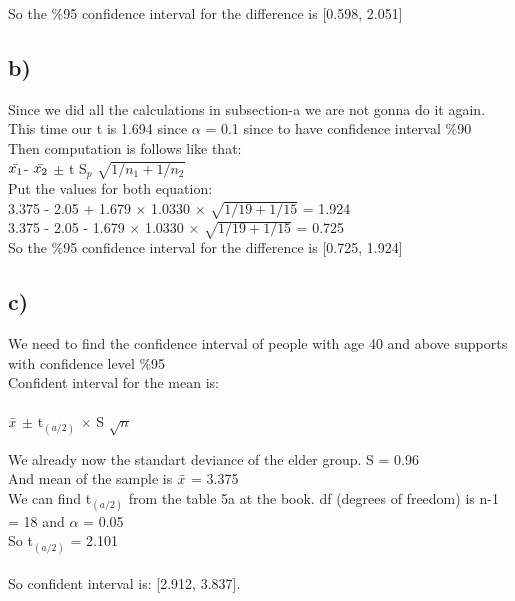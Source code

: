 \documentclass[12pt]{article}
\begin{document}
So the $\%$95 confidence interval for the difference is [0.598, 2.051]\\

\subsection*{b)} 

Since we did all the calculations in subsection-a we are not gonna do it again.\\
This time our t is 1.694 since $\alpha$ = 0.1 since to have confidence interval $\%$90\\

Then computation is follows like that:\\

$\Bar{x_1}$- $\Bar{x_2}$ $\pm$  t  S$_p$ $\sqrt{1/ n_1 + 1/n_2}$\\
Put the values for both equation:\\

3.375 - 2.05 +  1.679 $\times$ 1.0330 $\times$ $\sqrt{1/ 19 + 1/15}$ = 1.924\\
3.375 - 2.05 -  1.679 $\times$ 1.0330 $\times$ $\sqrt{1/ 19 + 1/15}$ = 0.725\\

So the $\%$95 confidence interval for the difference is [0.725, 1.924]\\

\subsection*{c)}

We need to find the confidence interval of people with age 40 and above supports with confidence level $\%$95 \\
Confident interval for the mean is:\\
\\
 $\Bar{x}$ $\pm$ t$_(a/2)$ $\times$ S $\sqrt{n}$   

We already now the standart deviance of the elder group. S = 0.96 \\
And mean of the sample is $\Bar{x}$ = 3.375\\
We can find t$_(a/2)$ from the table 5a at the book. df (degrees of freedom) is n-1 = 18 and $\alpha$ = 0.05\\
So t$_(a/2)$ = 2.101\\
\\

So confident interval is: [2.912, 3.837].
\end{document}
